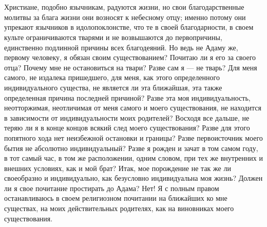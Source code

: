 \documentclass[12pt]{article}
\begin{document}
\section{}

Христиане, подобно язычникам, радуются жизни, но свои благодарственные молитвы за блага жизни они возносят к небесному отцу; именно потому они упрекают язычников в идолопоклонстве, что те в своей благодарности, в своем культе ограничиваются тварями и не возвышаются до первопричины, единственно подлинной причины всех благодеяний. Но ведь не Адаму же, первому человеку, я обязан своим существованием? Почитаю ли я его за своего отца? Почему мне не остановиться на твари? Разве сам я --- не тварь? Для меня самого, не издалека пришедшего, для меня, как этого определенного индивидуального существа, не является ли эта ближайшая, эта также определенная причина последней причиной? Разве эта моя индивидуальность, неотторжимая, неотличимая от меня самого и моего существования, не находится в зависимости от индивидуальности моих родителей? Восходя все дальше, не теряю ли я в конце концов всякий след моего существования? Разве для этого попятного хода нет неизбежной остановки и границы? Разве первоисточник моего бытия не абсолютно индивидуальный? Разве я рожден и зачат в том самом году, в тот самый час, в том же расположении, одним словом, при тех же внутренних и внешних условиях, как и мой брат? Итак, мое порождение не так же ли своеобразно и индивидуально, как безусловно индивидуальна моя жизнь? Должен ли я свое почитание простирать до Адама? Нет! Я с полным правом останавливаюсь в своем религиозном почитании на ближайших ко мне существах, на моих действительных родителях, как на виновниках моего существования.



\section{}
\end{document}
